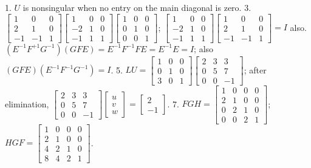 1. \(U\) is nonsingular when no entry on the main diagonal is zero.
3. \(\begin{bmatrix}1&0&0\\ 2&1&0\\ -1&-1&1\end{bmatrix}\begin{bmatrix}1&0&0\\ -2&1&0\\ -1&1&1\end{bmatrix}\begin{bmatrix}1&0&0\\ 0&1&0\\ 0&0&1\end{bmatrix}\); \(\begin{bmatrix}1&0&0\\ -2&1&0\\ -1&1&1\end{bmatrix}\begin{bmatrix}1&0&0\\ 2&1&0\\ -1&-1&1\end{bmatrix}=I\) also. \((E^{-1}F^{+1}G^{-1})(GFE)=E^{-1}F^{-1}FE=E^{-1}E=I\); also \((GFE)(E^{-1}F^{-1}G^{-1})=I\).
5. \(LU=\begin{bmatrix}1&0&0\\ 0&1&0\\ 3&0&1\end{bmatrix}\begin{bmatrix}2&3&3\\ 0&5&7\\ 0&0&-1\end{bmatrix}\); after elimination, \(\begin{bmatrix}2&3&3\\ 0&5&7\\ 0&0&-1\end{bmatrix}\begin{bmatrix}u\\ v\\ w\end{bmatrix}=\begin{bmatrix}2\\ -1\end{bmatrix}\).
7. \(FGH=\begin{bmatrix}1&0&0&0\\ 2&1&0&0\\ 0&2&1&0\\ 0&0&2&1\end{bmatrix}\); \(HGF=\begin{bmatrix}1&0&0&0\\ 2&1&0&0\\ 4&2&1&0\\ 8&4&2&1\end{bmatrix}\).
